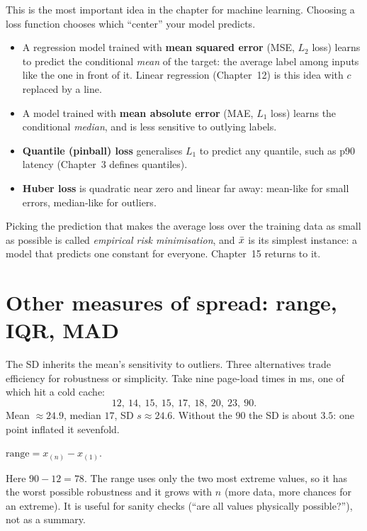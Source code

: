 \begin{connectionbox}
This is the most important idea in the chapter for machine learning. Choosing a
loss function chooses which ``center'' your model predicts.
\begin{itemize}
  \item A regression model trained with \textbf{mean squared error} (MSE, $L_2$
  loss) learns to predict the conditional \emph{mean} of the target: the average
  label among inputs like the one in front of it. Linear
  regression (Chapter~12) is this idea with $c$ replaced by a line.
  \item A model trained with \textbf{mean absolute error} (MAE, $L_1$ loss) learns
  the conditional \emph{median}, and is less sensitive to outlying labels.
  \item \textbf{Quantile (pinball) loss} generalises $L_1$ to predict any quantile,
  such as p90 latency (Chapter~3 defines quantiles).
  \item \textbf{Huber loss} is quadratic near zero and linear far away: mean-like
  for small errors, median-like for outliers.
\end{itemize}
Picking the prediction that makes the average loss over the training data as small
as possible is called \emph{empirical risk minimisation}, and $\bar{x}$ is its
simplest instance: a model that predicts one constant for everyone. Chapter~15 returns to it.
\end{connectionbox}

\section{Other measures of spread: range, IQR, MAD}
\label{sec:center-spread-robust-spread}

The SD inherits the mean's sensitivity to outliers. Three alternatives trade
efficiency for robustness or simplicity. Take nine page-load times in ms, one of
which hit a cold cache:
\[
  12,\ 14,\ 15,\ 15,\ 17,\ 18,\ 20,\ 23,\ 90 .
\]
Mean $\approx 24.9$, median $17$, SD $s \approx 24.6$. Without the 90 the SD is
about $3.5$: one point inflated it sevenfold.

\begin{definition}[Range]
$\text{range} = x_{(n)} - x_{(1)}$.
\end{definition}
Here $90 - 12 = 78$. The range uses only the two most extreme values, so it has the
worst possible robustness and it grows with $n$ (more data, more chances for an
extreme). It is useful for sanity checks (``are all values physically
possible?''), not as a summary.

